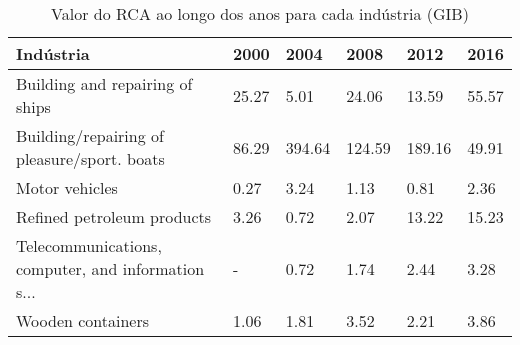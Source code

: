 \begin{table}
\centering
\caption{Valor do RCA ao longo dos anos para cada indústria (GIB)}
\begin{tabular}{p{6cm}p{1.5cm}p{1.5cm}p{1.5cm}p{1.5cm}p{1.5cm}}
\toprule
                                         Indústria &  2000 &   2004 &   2008 &   2012 &  2016 \\
\midrule
                   Building and repairing of ships & 25.27 &   5.01 &  24.06 &  13.59 & 55.57 \\
       Building/repairing of pleasure/sport. boats & 86.29 & 394.64 & 124.59 & 189.16 & 49.91 \\
                                    Motor vehicles &  0.27 &   3.24 &   1.13 &   0.81 &  2.36 \\
                        Refined petroleum products &  3.26 &   0.72 &   2.07 &  13.22 & 15.23 \\
Telecommunications, computer, and information s... &     - &   0.72 &   1.74 &   2.44 &  3.28 \\
                                 Wooden containers &  1.06 &   1.81 &   3.52 &   2.21 &  3.86 \\
\bottomrule
\end{tabular}
\end{table}
